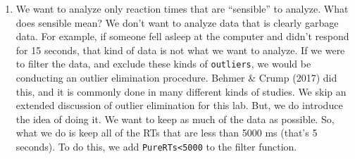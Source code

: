\documentclass[
]{book}
\providecommand{\tightlist}{%
  \setlength{\itemsep}{0pt}\setlength{\parskip}{0pt}}
\begin{document}
\begin{enumerate}
\def\labelenumi{\arabic{enumi}.}
\setcounter{enumi}{2}
\tightlist
\item
  We want to analyze only reaction times that are ``sensible'' to analyze. What does sensible mean? We don't want to analyze data that is clearly garbage data. For example, if someone fell asleep at the computer and didn't respond for 15 seconds, that kind of data is not what we want to analyze. If we were to filter the data, and exclude these kinds of \texttt{outliers}, we would be conducting an outlier elimination procedure. Behmer \& Crump (2017) did this, and it is commonly done in many different kinds of studies. We skip an extended discussion of outlier elimination for this lab. But, we do introduce the idea of doing it. We want to keep as much of the data as possible. So, what we do is keep all of the RTs that are less than 5000 ms (that's 5 seconds). To do this, we add \texttt{PureRTs\textless{}5000} to the filter function.
\end{enumerate}
\end{document}
